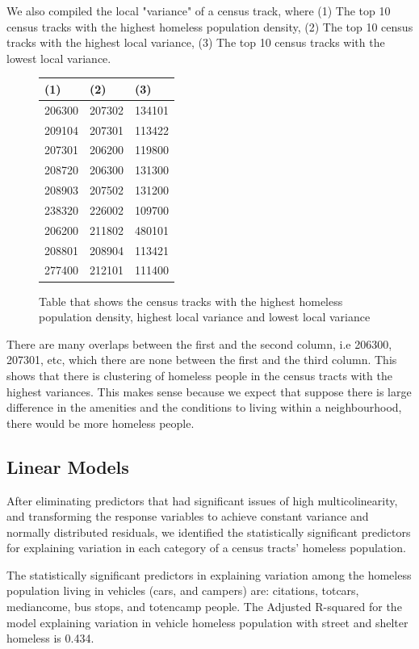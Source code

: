 \documentclass[11pt,letterpaper]{article}
\begin{document}
We also compiled the local "variance" of a census track, where (1) The top 10 census tracks with the highest homeless population density,
(2) The top 10 census tracks with the highest local variance, (3) The top 10 census tracks with the lowest local variance.\\


\begin{figure}[H]
\centering
\caption{Table that shows the census tracks with the highest homeless population density, highest local variance and lowest local variance}
\begin{tabular}{|l|l|l|}
\hline
(1)    & (2)    & (3)    \\ \hline
206300 & 207302 & 134101 \\ \hline
209104 & 207301 & 113422 \\ \hline
207301 & 206200 & 119800 \\ \hline
208720 & 206300 & 131300 \\ \hline
208903 & 207502 & 131200 \\ \hline
238320 & 226002 & 109700 \\ \hline
206200 & 211802 & 480101 \\ \hline
208801 & 208904 & 113421 \\ \hline
277400 & 212101 & 111400 \\ \hline
\end{tabular}
\end{figure}

There are many overlaps between the first and the second column, i.e 206300, 207301, etc, which there are none between the first and the third column. This shows that there is clustering of homeless people in the census tracts with the highest variances. This makes sense because we expect that suppose there is large difference in the amenities and the conditions to living within a neighbourhood, there would be more homeless people.

\subsection{Linear Models}

After eliminating predictors that had significant issues of high multicolinearity, and transforming the response variables to achieve constant variance and normally distributed residuals, we identified the statistically significant predictors for explaining variation in each category of a census tracts’ homeless population.

The statistically significant predictors in explaining variation among the homeless population living in vehicles (cars, and campers) are: citations, totcars, mediancome, bus stops, and totencamp people. The Adjusted R-squared for the model explaining variation in vehicle homeless population with street and shelter homeless is  0.434.
\end{document}
